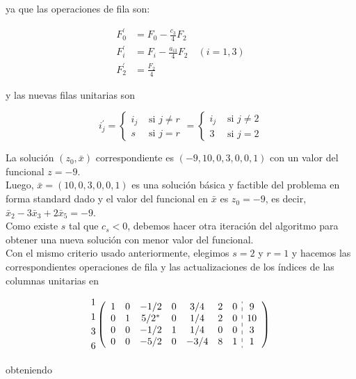 \documentclass[10pt]{article}
\begin{document}
ya que las operaciones de fila son:

$$
\begin{aligned}
F_{0}^{\prime} & =F_{0}-\frac{c_{3}}{4} F_{2} \\
F_{i}^{\prime} & =F_{i}-\frac{a_{i 3}}{4} F_{2} \quad(i=1,3) \\
F_{2}^{\prime} & =\frac{F_{2}}{4}
\end{aligned}
$$

y las nuevas filas unitarias son

$$
i_{j}^{\prime}=\left\{\begin{array}{ll}
i_{j} & \text { si } j \neq r \\
s & \text { si } j=r
\end{array}=\left\{\begin{array}{lr}
i_{j} & \text { si } j \neq 2 \\
3 & \text { si } j=2
\end{array}\right.\right.
$$

La solución $\left(z_{0}, \bar{x}\right)$ correspondiente es $(-9,10,0,3,0,0,1)$ con un valor del funcional $z=-9$.\\
Luego, $\bar{x}=(10,0,3,0,0,1)$ es una solución básica y factible del problema en forma standard dado y el valor del funcional en $\bar{x}$ es $z_{0}=-9$, es decir, $\bar{x}_{2}-3 \bar{x}_{3}+2 \bar{x}_{5}=-9$.\\
Como existe $s$ tal que $c_{s}<0$, debemos hacer otra iteración del algoritmo para obtener una nueva solución con menor valor del funcional.\\
Con el mismo criterio usado anteriormente, elegimos $s=2$ y $r=1$ y hacemos las correspondientes operaciones de fila y las actualizaciones de los índices de las columnas unitarias en

$$
\begin{aligned}
& 1 \\
& 1 \\
& 3 \\
& 6
\end{aligned}\left(\begin{array}{ccccccc:c}
1 & 0 & -1 / 2 & 0 & 3 / 4 & 2 & 0 & 9 \\
0 & 1 & 5 / 2^{*} & 0 & 1 / 4 & 2 & 0 & 10 \\
0 & 0 & -1 / 2 & 1 & 1 / 4 & 0 & 0 & 3 \\
0 & 0 & -5 / 2 & 0 & -3 / 4 & 8 & 1 & 1
\end{array}\right)
$$

obteniendo
\end{document}
